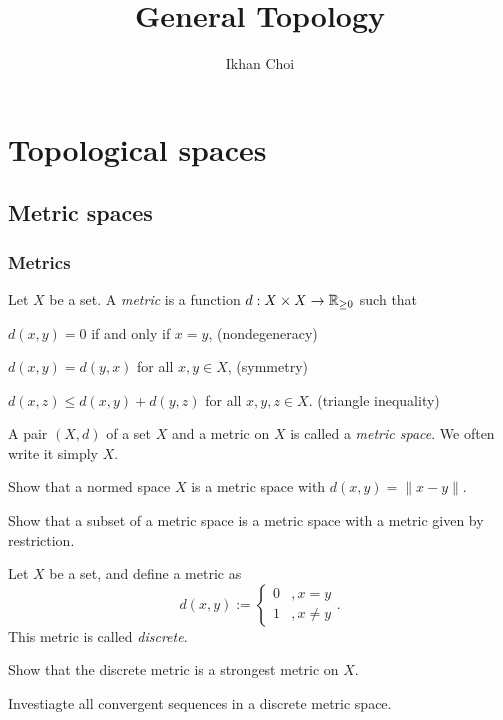\documentclass{../note}
\begin{document}
\title{General Topology}
\author{Ikhan Choi}
\maketitle
\tableofcontents

\part{Topological spaces}

\chapter{Metric spaces}
\section{Metrics}

\begin{prb}
Let $X$ be a set.
A \emph{metric} is a function $d:X\times X\to\mathbb{R}_{\ge0}$ such that
\begin{parts}[(i)]
\item $d(x,y)=0$ if and only if $x=y$, \hfill(nondegeneracy)
\item $d(x,y)=d(y,x)$ for all $x,y\in X$, \hfill(symmetry)
\item $d(x,z)\le d(x,y)+d(y,z)$ for all $x,y,z\in X$. \hfill(triangle inequality)
\end{parts}
A pair $(X,d)$ of a set $X$ and a metric on $X$ is called a \emph{metric space}.
We often write it simply $X$.
\begin{parts}
\item
Show that a normed space $X$ is a metric space with $d(x,y)=\|x-y\|$.
\item
Show that a subset of a metric space is a metric space with a metric given by restriction.
\end{parts}
\end{prb}

\begin{prb}
Let $X$ be a set, and define a metric as
\[d(x,y):=\begin{cases}0&,x=y\\1&,x\ne y\end{cases}.\]
This metric is called \emph{discrete}.
\begin{parts}
\item
Show that the discrete metric is a strongest metric on $X$.
\item
Investiagte all convergent sequences in a discrete metric space.
\end{parts}
\end{prb}
\end{document}
